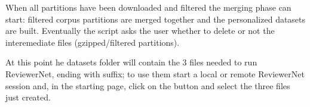 When all partitions have been downloaded and filtered the merging phase can start: filtered corpus partitions are merged together and the personalized datasets are built. Eventually the script asks the user whether to delete or not the interemediate files (gzipped/filtered partitions).

At this point he datasets folder will contain the 3 files needed to run ReviewerNet, ending with  suffix; to use them start a local or remote ReviewerNet session and, in the starting page, click on the  button and select the three files just created.
